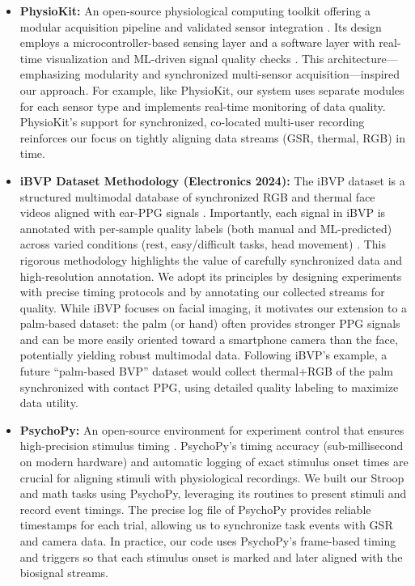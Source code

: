 \documentclass{report}
\begin{document}
    \begin{itemize}
        \item \textbf{PhysioKit:} An open-source physiological computing toolkit offering a modular acquisition pipeline and validated sensor integration \cite{physiokit}. Its design employs a microcontroller-based sensing layer and a software layer with real-time visualization and ML-driven signal quality checks \cite{physiokit}. This architecture---emphasizing modularity and synchronized multi-sensor acquisition---inspired our approach. For example, like PhysioKit, our system uses separate modules for each sensor type and implements real-time monitoring of data quality. PhysioKit's support for synchronized, co-located multi-user recording \cite{physiokit} reinforces our focus on tightly aligning data streams (GSR, thermal, RGB) in time.

        \item \textbf{iBVP Dataset Methodology (Electronics 2024):} The iBVP dataset is a structured multimodal database of synchronized RGB and thermal face videos aligned with ear-PPG signals \cite{ibvp}. Importantly, each signal in iBVP is annotated with per-sample quality labels (both manual and ML-predicted) across varied conditions (rest, easy/difficult tasks, head movement) \cite{ibvp}. This rigorous methodology highlights the value of carefully synchronized data and high-resolution annotation. We adopt its principles by designing experiments with precise timing protocols and by annotating our collected streams for quality. While iBVP focuses on facial imaging, it motivates our extension to a palm-based dataset: the palm (or hand) often provides stronger PPG signals and can be more easily oriented toward a smartphone camera than the face, potentially yielding robust multimodal data. Following iBVP's example, a future ``palm-based BVP'' dataset would collect thermal+RGB of the palm synchronized with contact PPG, using detailed quality labeling to maximize data utility.

        \item \textbf{PsychoPy:} An open-source environment for experiment control that ensures high-precision stimulus timing \cite{psychopy}. PsychoPy's timing accuracy (sub-millisecond on modern hardware) and automatic logging of exact stimulus onset times \cite{psychopy} are crucial for aligning stimuli with physiological recordings. We built our Stroop and math tasks using PsychoPy, leveraging its routines to present stimuli and record event timings. The precise log file of PsychoPy provides reliable timestamps for each trial, allowing us to synchronize task events with GSR and camera data. In practice, our code uses PsychoPy's frame-based timing and triggers so that each stimulus onset is marked and later aligned with the biosignal streams.


\end{itemize}
\end{document}
